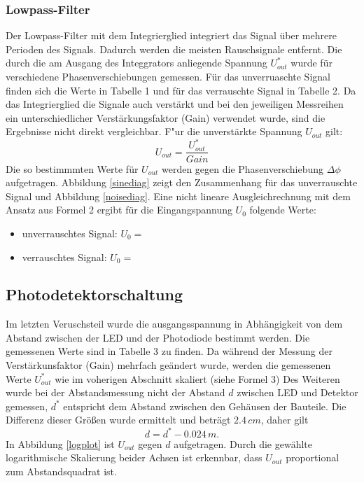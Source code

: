 \documentclass[11pt]{article}
\begin{document}
\subsubsection{Lowpass-Filter}

Der Lowpass-Filter mit dem Integrierglied integriert das Signal über mehrere Perioden des Signals. Dadurch werden die meisten Rauschsignale entfernt. Die durch die am Ausgang des Integgrators anliegende Spannung $U_{out}^*$ wurde f\"ur verschiedene Phasenverschiebungen gemessen. F\"ur das unverruaschte Signal finden sich die Werte in Tabelle 1 und f\"ur das verrauschte Signal in Tabelle 2. Da das Integrierglied die Signale auch verst\"arkt und bei den jeweiligen Messreihen ein unterschiedlicher Verst\"arkungsfaktor (Gain) verwendet wurde, sind die Ergebnisse nicht direkt vergleichbar. F"ur die unverst\"arkte Spannung $U_{out}$ gilt:
\begin{equation}
U_{out} = \frac{U_{out}^*}{Gain}
\end{equation}
Die so bestimmmten Werte f\"ur $U_{out}$ werden gegen die Phasenverschiebung $\Delta \phi$ aufgetragen. Abbildung \ref{sinediag} zeigt den Zusammenhang f\"ur das unverrauschte Signal und Abbildung \ref{noisediag}. Eine nicht lineare Ausgleichrechnung mit dem Ansatz aus Formel 2 ergibt f\"ur die Eingangspannung $U_0$ folgende Werte:
\begin{itemize}
\item unverrauschtes Signal: $U_0=$
\item verrauschtes Signal: $U_0=$
\end{itemize} 



\subsection{Photodetektorschaltung}
Im letzten Veruschsteil wurde die ausgangsspannung in Abhängigkeit von dem Abstand zwischen der LED und der Photodiode bestimmt werden. Die gemessenen Werte sind  in Tabelle 3 zu finden. Da während der Messung der Verstärkunsfaktor (Gain) mehrfach geändert wurde, werden die gemessenen Werte $U_{out}^*$ wie im voherigen Abschnitt skaliert (siehe Formel 3)
Des Weiteren wurde bei der Abstandsmessung nicht der Abstand $d$ zwischen LED und Detektor gemessen, $d^*$ entspricht dem Abstand zwischen den Gehäusen der Bauteile. Die Differenz dieser Größen wurde ermittelt und beträgt $2.4 \,cm$, daher gilt 
\begin{equation}
d = d^* - 0.024\,m .
\end{equation}
In  Abbildung \ref{logplot} ist $U_{out}$ gegen $d$ aufgetragen. Durch die gewählte logarithmische Skalierung beider Achsen ist erkennbar, dass $U_{out}$ proportional zum Abstandsquadrat ist.
\end{document}
